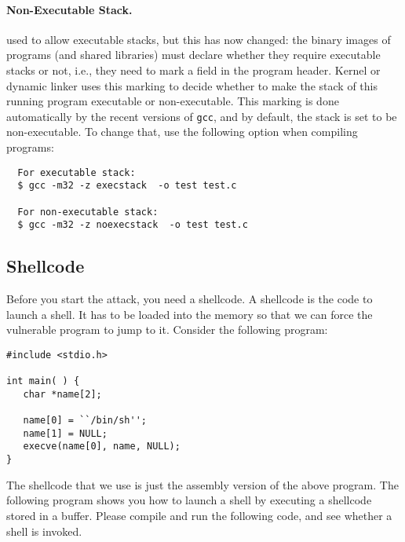 \paragraph{Non-Executable Stack.} \ubuntu used to allow executable stacks, but
this has now changed: the binary images of programs (and shared libraries) 
must declare whether they require executable stacks or not, i.e., they need to 
mark a field in the program header. Kernel or dynamic linker uses this marking
to decide whether to make the stack of this running program executable or 
non-executable. This marking is done automatically by the 
recent versions of {\tt gcc}, and by default, the stack is set to 
be non-executable.  To change that, use the following option when compiling
programs:
\begin{verbatim}
  For executable stack:
  $ gcc -m32 -z execstack  -o test test.c

  For non-executable stack:
  $ gcc -m32 -z noexecstack  -o test test.c
\end{verbatim}



\subsection{Shellcode}
Before you start the attack, you need a shellcode. A shellcode is the code to
launch a shell. It has to be loaded into the memory so that we can force the
vulnerable program to jump to it. Consider the following program:

\begin{verbatim}
#include <stdio.h>

int main( ) {
   char *name[2];

   name[0] = ``/bin/sh'';
   name[1] = NULL;
   execve(name[0], name, NULL);
}
\end{verbatim}


The shellcode that we use is just the assembly version of the above program.
The following program shows you how to launch a shell by executing 
a shellcode stored in a buffer.
Please compile and run the following code, and see whether a
shell is invoked. 

